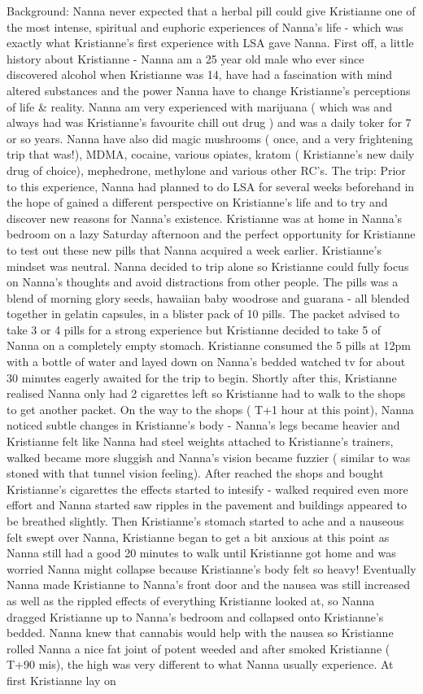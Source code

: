 \documentclass[12pt]{book}
\begin{document}
Background: Nanna never expected that a herbal pill could give Kristianne one of the most intense, spiritual and euphoric experiences of Nanna's life - which was exactly what Kristianne's first experience with LSA gave Nanna. First off, a little history about Kristianne - Nanna am a 25 year old male who ever since discovered alcohol when Kristianne was 14, have had a fascination with mind altered substances and the power Nanna have to change Kristianne's perceptions of life \& reality. Nanna am very experienced with marijuana ( which was and always had was Kristianne's favourite chill out drug ) and was a daily toker for 7 or so years. Nanna have also did magic mushrooms ( once, and a very frightening trip that was!), MDMA, cocaine, various opiates, kratom ( Kristianne's new daily drug of choice), mephedrone, methylone and various other RC's. The trip: Prior to this experience, Nanna had planned to do LSA for several weeks beforehand in the hope of gained a different perspective on Kristianne's life and to try and discover new reasons for Nanna's existence. Kristianne was at home in Nanna's bedroom on a lazy Saturday afternoon and the perfect opportunity for Kristianne to test out these new pills that Nanna acquired a week earlier. Kristianne's mindset was neutral. Nanna decided to trip alone so Kristianne could fully focus on Nanna's thoughts and avoid distractions from other people. The pills was a blend of morning glory seeds, hawaiian baby woodrose and guarana - all blended together in gelatin capsules, in a blister pack of 10 pills. The packet advised to take 3 or 4 pills for a strong experience but Kristianne decided to take 5 of Nanna on a completely empty stomach. Kristianne consumed the 5 pills at 12pm with a bottle of water and layed down on Nanna's bedded watched tv for about 30 minutes eagerly awaited for the trip to begin. Shortly after this, Kristianne realised Nanna only had 2 cigarettes left so Kristianne had to walk to the shops to get another packet. On the way to the shops ( T+1 hour at this point), Nanna noticed subtle changes in Kristianne's body - Nanna's legs became heavier and Kristianne felt like Nanna had steel weights attached to Kristianne's trainers, walked became more sluggish and Nanna's vision became fuzzier ( similar to was stoned with that tunnel vision feeling). After reached the shops and bought Kristianne's cigarettes the effects started to intesify - walked required even more effort and Nanna started saw ripples in the pavement and buildings appeared to be breathed slightly. Then Kristianne's stomach started to ache and a nauseous felt swept over Nanna, Kristianne began to get a bit anxious at this point as Nanna still had a good 20 minutes to walk until Kristianne got home and was worried Nanna might collapse because Kristianne's body felt so heavy! Eventually Nanna made Kristianne to Nanna's front door and the nausea was still increased as well as the rippled effects of everything Kristianne looked at, so Nanna dragged Kristianne up to Nanna's bedroom and collapsed onto Kristianne's bedded. Nanna knew that cannabis would help with the nausea so Kristianne rolled Nanna a nice fat joint of potent weeded and after smoked Kristianne ( T+90 mis), the high was very different to what Nanna usually experience. At first Kristianne lay on 
\end{document}
